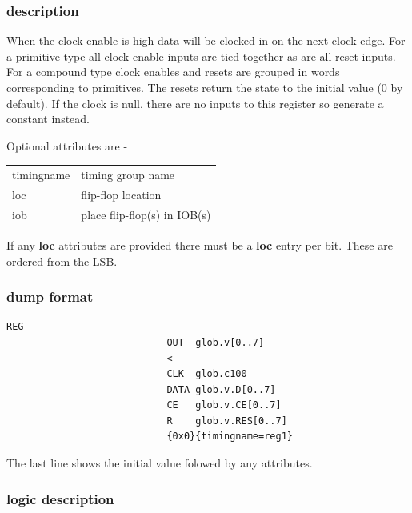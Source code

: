 \documentclass[10pt,a4paper,twoside,fleqn]{book}
\begin{document}
                \subsubsection{description}

                    When the clock enable is high data will be clocked in on
                    the next clock edge. For a primitive type all clock enable
                    inputs are tied together as are all reset inputs. For
                    a compound type clock enables and resets are grouped in words
                    corresponding to primitives. The resets return the state to
                    the initial value (0 by default).
                    If the clock is null, there are no inputs to
                    this register so generate a constant instead.
                
                    Optional attributes are -
                    \begin{tabular}{| l | l |}
                    \hline
                    timingname  & timing group name \\
                    loc         & flip-flop location \\
                    iob         & place flip-flop(s) in IOB(s) \\
                    \hline
                    \end{tabular}
                    If any {\bf loc} attributes are provided there must be a {\bf loc} entry per bit.
                    These are ordered from the LSB.

                \subsubsection{dump format}

                    \begin{lstlisting}[gobble=20, language=tde]
                        REG
                            OUT  glob.v[0..7]
                            <-
                            CLK  glob.c100
                            DATA glob.v.D[0..7]
                            CE   glob.v.CE[0..7]
                            R    glob.v.RES[0..7]
                            {0x0}{timingname=reg1}
                    \end{lstlisting}
                    The last line shows the initial value folowed by any attributes.

                \subsubsection{logic description}
\end{document}
